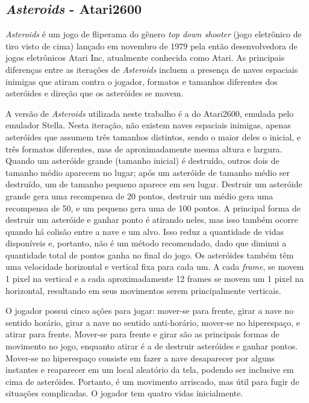 \subsection{\textit{Asteroids} - Atari2600}
\label{asteroids}

\textit{Asteroids} é um jogo de fliperama do gênero \textit{top down shooter} (jogo eletrônico de tiro visto de cima) lançado em novembro de 1979 pela então desenvolvedora de jogos eletrônicos Atari Inc, atualmente conhecida como Atari.
As principais diferenças entre as iterações de \textit{Asteroids} incluem a presença de naves espaciais inimigas que atiram contra o jogador, formatos e tamanhos diferentes dos asteróides e direção que os asteróides se movem.

A versão de \textit{Asteroids} utilizada neste trabalho é a do Atari2600, emulada pelo emulador Stella.
Nesta iteração, não existem naves espaciais inimigas, apenas asteróides que assumem três tamanhos distintos, sendo o maior deles o inicial, e três formatos diferentes, mas de aproximadamente mesma altura e largura.
Quando um asteróide grande (tamanho inicial) é destruído, outros dois de tamanho médio aparecem no lugar; após um asteróide de tamanho médio ser destruído, um de tamanho pequeno aparece em seu lugar.
Destruir um asteróide grande gera uma recompensa de 20 pontos, destruir um médio gera uma recompensa de 50, e um pequeno gera uma de 100 pontos.
A principal forma de destruir um asteróide e ganhar ponto é atirando neles, mas isso também ocorre quando há colisão entre a nave e um alvo.
Isso reduz a quantidade de vidas disponíveis e, portanto, não é um método recomendado, dado que diminui a quantidade total de pontos ganha no final do jogo.
Os asteróides também têm uma velocidade horizontal e vertical fixa para cada um.
A cada \textit{frame}, se movem 1 pixel na vertical e a cada aproximadamente 12 frames se movem um 1 pixel na horizontal, resultando em seus movimentos serem principalmente verticais.

O jogador possui cinco ações para jogar: mover-se para frente, girar a nave no sentido horário, girar a nave no sentido anti-horário, mover-se no hiperespaço, e atirar para frente.
Mover-se para frente e girar são as principais formas de movimento no jogo, enquanto atirar é a de destruir asteróides e ganhar pontos.
Mover-se no hiperespaço consiste em fazer a nave desaparecer por alguns instantes e reaparecer em um local aleatório da tela, podendo ser inclusive em cima de asteróides.
Portanto, é um movimento arriscado, mas útil para fugir de situações complicadas.
O jogador tem quatro vidas inicialmente.


